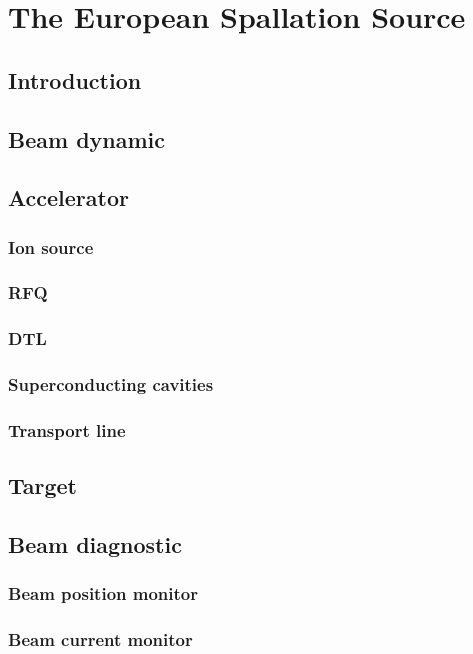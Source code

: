 \chapter{The European Spallation Source}
\cleardoublepage

\minitoc
\section{Introduction}
\begin{refsection}
	\label{ch2:Introduction}

	\section{Beam dynamic}
	\section{Accelerator}
	\subsection{Ion source}
	\subsection{RFQ}
	\subsection{DTL}
	\subsection{Superconducting cavities}
	\subsection{Transport line}

	\section{Target}

	\section{Beam diagnostic}
	\subsection{Beam position monitor}
	\subsection{Beam current monitor}

\end{refsection}
